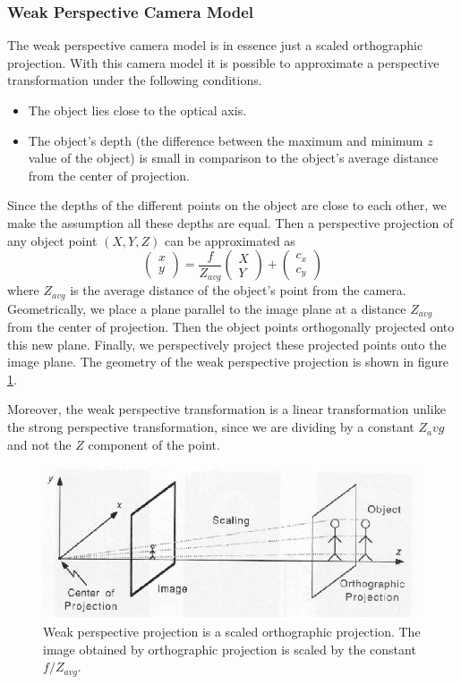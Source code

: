 \documentclass[11pt,a4paper]{report}
\begin{document}
\subsubsection{Weak Perspective Camera Model}
The weak perspective camera model is in essence just a scaled orthographic
projection. With this camera model it is possible to approximate a perspective
transformation under the following conditions.
\begin{itemize}
\item The object lies close to the optical axis.
\item The object's depth (the difference between the maximum and minimum $z$ value of the
  object) is small in comparison to the object's average distance from the
  center of projection.
\end{itemize}
Since the depths of the different points on the object are close to each other,
we make the assumption all these depths are equal. Then a perspective projection
of any object point $(X,Y,Z)$ can be approximated as
\begin{equation}
\begin{pmatrix}x\\y\end{pmatrix} = \frac{f}{Z_{avg}}\begin{pmatrix}X\\Y\end{pmatrix}
    + \begin{pmatrix}c_x\\c_y\end{pmatrix}
\end{equation}
where $Z_{avg}$ is the average distance of the object's point from the
camera. Geometrically, we place a plane parallel to the image plane at a
distance $Z_{avg}$ from the center of projection. Then the object points
orthogonally projected onto this new plane. Finally, we perspectively project
these projected points onto the image plane. The geometry of the weak perspective projection is shown in figure \ref{fg:weakOrtho}.

Moreover, the weak perspective transformation is a linear
transformation unlike the strong perspective transformation, since we are
dividing by a constant $Z_avg$ and not the $Z$ component of the
point.

\begin{figure}[H] 
\centering
\includegraphics[scale=0.75]{images/weak_persp.png}
\caption{Weak perspective projection is a scaled orthographic projection. The
  image obtained by orthographic projection is scaled by the constant $f/Z_{avg}$.}
\label{fg:weakOrtho}
\end{figure}
  
\end{document}
